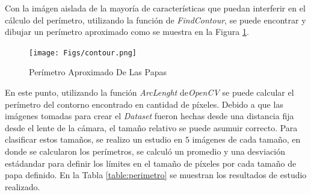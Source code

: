 	Con la imágen aislada de la mayoría de características que puedan interferir en el cálculo del perímetro, utilizando la función de \textit{FindContour}, se puede encontrar y dibujar un perímetro aproximado como se muestra en la Figura \ref{fig:contour}.
	
	\begin{figure}[ht]
		\centering
		\texttt{[image: Figs/contour.png]}
		\caption{Perímetro Aproximado De Las Papas}
		\label{fig:contour}
	\end{figure}
	
	En este punto, utilizando la función \textit{ArcLenght} de\textit{OpenCV} se puede calcular el perímetro del contorno encontrado en cantidad de píxeles. Debido a que las imágenes tomadas para crear el \textit{Dataset} fueron hechas desde una distancia fija desde el lente de la cámara, el tamaño relativo se puede asumuir correcto. Para clasificar estos tamaños, se realizo un estudio en $5$ imágenes de cada tamaño, en donde se calcularon los perímetros, se calculó un promedio y una desviación estádandar para definir los límites en el tamaño de píxeles por cada tamaño de papa definido. En la Tabla \ref{table:perimetro} se muestran los resultados de estudio realizado.
	

